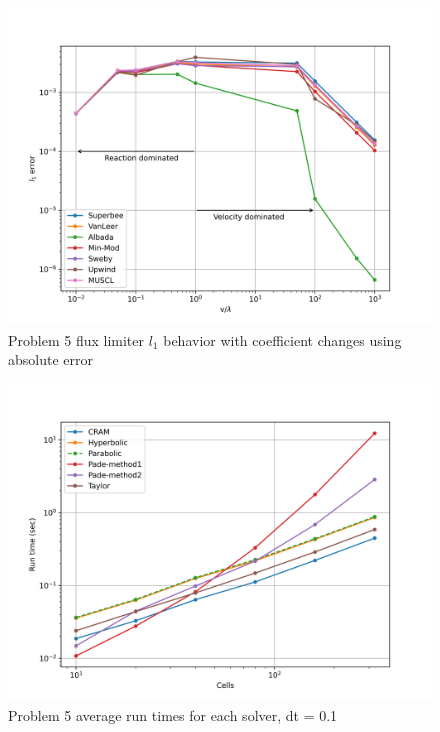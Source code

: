 \clearpage

\begin{figure}[p]
    \centering
    \includegraphics[width=6in]{images/chapter-5/progressionProblems/problem5/problem5CoefficientChanges.png}
    \caption{Problem 5 flux limiter $l_{1}$ behavior with coefficient changes using absolute error}
    \label{fig:problem5_l1error_coefficient_changes}
\end{figure}

\clearpage

\begin{figure}[p]
    \centering
    \includegraphics[width=6in]{images/chapter-5/progressionProblems/problem5/problem5Runtimes.png}
    \caption{Problem 5 average run times for each solver, dt = 0.1}
    \label{fig:problem5_runtimes}
\end{figure}

